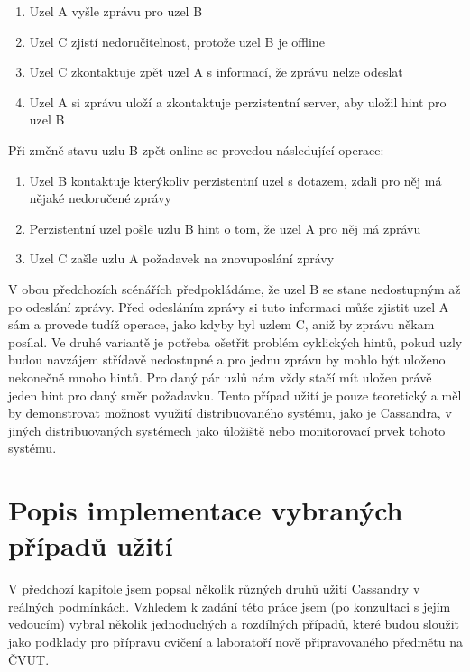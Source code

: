 \begin{enumerate}
\item Uzel A vyšle zprávu pro uzel B
\item Uzel C zjistí nedoručitelnost, protože uzel B je offline
\item Uzel C zkontaktuje zpět uzel A s informací, že zprávu nelze odeslat
\item Uzel A si zprávu uloží a zkontaktuje perzistentní server, aby uložil hint pro uzel B

\end{enumerate}

Při změně stavu uzlu B zpět online se provedou následující operace:

\begin{enumerate}
\item Uzel B kontaktuje kterýkoliv perzistentní uzel s dotazem, zdali pro něj má nějaké nedoručené zprávy
\item Perzistentní uzel pošle uzlu B hint o tom, že uzel A pro něj má zprávu
\item Uzel C zašle uzlu A požadavek na znovuposlání zprávy
\end{enumerate}


V obou předchozích scénářích předpokládáme, že uzel B se stane nedostupným až po odeslání zprávy. Před odesláním zprávy si tuto informaci může zjistit uzel A sám a provede tudíž operace, jako kdyby byl uzlem C, aniž by zprávu někam posílal. Ve druhé variantě je potřeba ošetřit problém cyklických hintů, pokud uzly budou navzájem střídavě nedostupné a pro jednu zprávu by mohlo být uloženo nekonečně mnoho hintů. Pro daný pár uzlů nám vždy stačí mít uložen právě jeden hint pro daný směr požadavku. Tento případ užití je pouze teoretický a měl by demonstrovat možnost využití distribuovaného systému, jako je Cassandra, v jiných distribuovaných systémech jako úložiště nebo monitorovací prvek tohoto systému. 


\chapter{Popis implementace vybraných případů užití}
V předchozí kapitole jsem popsal několik různých druhů užití Cassandry v reálných podmínkách. Vzhledem k zadání této práce jsem (po konzultaci s jejím vedoucím) vybral několik jednoduchých a rozdílných případů, které budou sloužit jako podklady pro přípravu cvičení a laboratoří nově připravovaného předmětu na ČVUT.

